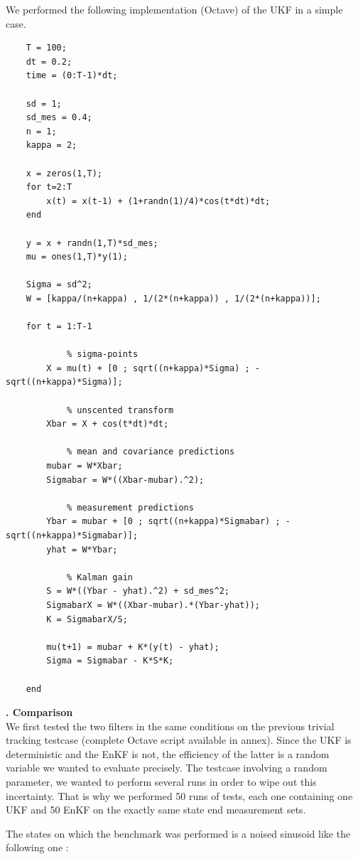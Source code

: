 \documentclass[a4paper]{article}
\newcounter{c}
\newcounter{d}
\newcounter{r}
\newcounter{e}
\newcommand{\chapitre}[1]{\stepcounter{c}\setcounter{e}{0}\setcounter{d}{0}\setcounter{r}{0}\noindent\textbf{\Large\arabic{c}. #1}\\}
\begin{document}
We performed the following implementation (Octave) of the UKF in a simple case.


\begin{verbatim}
    T = 100;
    dt = 0.2;
    time = (0:T-1)*dt;
    
    sd = 1;
    sd_mes = 0.4;
    n = 1;
    kappa = 2;
    
    x = zeros(1,T);
    for t=2:T
        x(t) = x(t-1) + (1+randn(1)/4)*cos(t*dt)*dt;
    end
    
    y = x + randn(1,T)*sd_mes;
    mu = ones(1,T)*y(1);
    
    Sigma = sd^2;
    W = [kappa/(n+kappa) , 1/(2*(n+kappa)) , 1/(2*(n+kappa))];
    
    for t = 1:T-1
        
            % sigma-points
        X = mu(t) + [0 ; sqrt((n+kappa)*Sigma) ; -sqrt((n+kappa)*Sigma)];
   
            % unscented transform
        Xbar = X + cos(t*dt)*dt;
        
            % mean and covariance predictions
        mubar = W*Xbar;
        Sigmabar = W*((Xbar-mubar).^2);
            
            % measurement predictions
        Ybar = mubar + [0 ; sqrt((n+kappa)*Sigmabar) ; -sqrt((n+kappa)*Sigmabar)];
        yhat = W*Ybar;

            % Kalman gain
        S = W*((Ybar - yhat).^2) + sd_mes^2;
        SigmabarX = W*((Xbar-mubar).*(Ybar-yhat));
        K = SigmabarX/S;
        
        mu(t+1) = mubar + K*(y(t) - yhat);
        Sigma = Sigmabar - K*S*K;
        
    end
\end{verbatim}



\newpage
\chapitre{Comparison}

We first tested the two filters in the same conditions on the previous trivial tracking testcase (complete Octave script available in annex). Since the UKF is deterministic and the EnKF is not, the efficiency of the latter is a random variable we wanted to evaluate precisely. The testcase involving a random parameter, we wanted to perform several runs in order to wipe out this incertainty. That is why we performed 50 runs of tests, each one containing one UKF and 50 EnKF on the exactly same state end measurement sets.


The states on which the benchmark was performed is a noised sinusoid like the following one :
\end{document}
